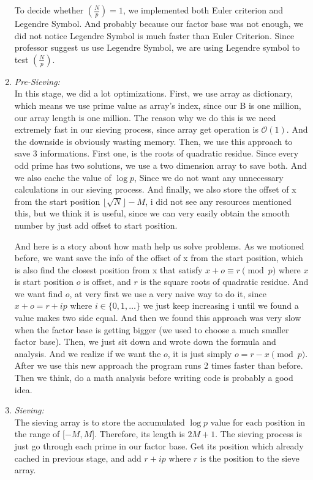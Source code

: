 \documentclass[12pt]{article} %
\newcommand{\legendre}[2]{\left(\frac{#1}{#2}\right)}
\begin{document}
\begin{enumerate}
To decide whether $\legendre{N}{p} = 1$, we implemented both Euler criterion and Legendre Symbol. And probably because our factor base was not enough, we did not notice Legendre Symbol is much faster than Euler Criterion. Since professor suggest us use Legendre Symbol, we are using Legendre symbol to test $\legendre{N}{p}$.

\item \textit{Pre-Sieving:} \vspace{2mm}
\\ In this stage, we did a lot optimizations. First, we use array as dictionary, which means we use prime value as array's index, since our B is one million, our array length is one million. The reason why we do this is we need extremely fast in our sieving process, since array get operation is $\mathcal{O}(1)$. And the downside is obviously wasting memory. Then, we use this approach to save 3 informations. First one, is the roots of quadratic residue. Since every odd prime has two solutions, we use a two dimension array to save both. And we also cache the value of $\log p$, Since we do not want any unnecessary calculations in our sieving process. And finally, we also store the offset of x from the start position $\lfloor \sqrt{N} \rfloor - M$, i did not see any resources mentioned this, but we think it is useful, since we can very easily obtain the smooth number by just add offset to start position. 

And here is a story about how math help us solve problems. As we motioned before, we want save the info of the offset of x from the start position, which is also find the closest position from x that satisfy $x+o \equiv r \pmod{p}$ where $x$ is start position $o$ is offset, and $r$ is the square roots of quadratic residue. And we want find $o$, at very first we use a very naive way to do it, since $x+o=r+ip$ where $i \in \{0,1,\dots\}$ we just keep increasing i until we found a value makes two side equal. And then we found this approach was very slow when the factor base is getting bigger (we used to choose a much smaller factor base). Then, we just sit down and wrote down the formula and analysis. And we realize if we want the $o$, it is just simply $o = r-x \pmod{p}$. After we use this new approach the program runs 2 times faster than before. Then we think, do a math analysis before writing code is probably a good idea.

\item \textit{Sieving:} \vspace{2mm}
\\ The sieving array is to store the accumulated $\log{p}$ value for each position in the range of [$-M, M$]. Therefore, its length is $2M+1$. The sieving process is just go through each prime in our factor base. Get its position which already cached in previous stage, and add $r+ip$ where $r$ is the position to the sieve array.


\end{enumerate}
\end{document}
